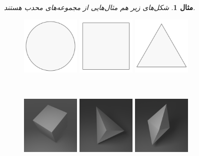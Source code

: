 \documentclass[12pt]{book}
\newtheorem{ex}[thm]{\textbf{مثال}}
\begin{document}
	\begin{ex}
		شکل‌های زیر هم مثال‌هایی از مجموعه‌های محدب	هستند.
		\begin{figure}[h]
			\centering
			\includegraphics[width=0.25\textwidth]{convex_circle}
			\includegraphics[width=0.25\textwidth]{convex_square}
			\includegraphics[width=0.25\textwidth]{convex_triangle}
			\caption{‌}
			\label{convex_ex_2}
		\end{figure}
		\begin{figure}[h]
			\centering
			\includegraphics[width=0.25\textwidth]{convex_cube}
			\includegraphics[width=0.25\textwidth]{convex_tetrahedron}
			\includegraphics[width=0.25\textwidth]{convex_octahedron}
			\caption{‌}
			\label{convex_ex_3}
		\end{figure}
	\end{ex}
	
\end{document}
